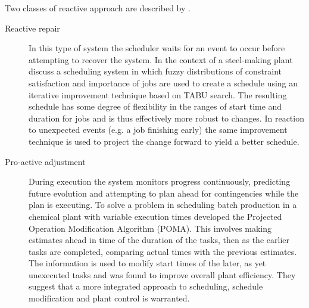 Two classes of reactive approach are described by \citet{jones98survey}.
\begin{description}
\item [Reactive repair] In this type of system the scheduler waits for an event to occur before attempting to recover the system. In the context of a steel-making plant \citet{dorn95reactive} discuss a scheduling system in which fuzzy distributions of constraint satisfaction and importance of jobs are used to create a schedule using an iterative improvement technique based on TABU search. The resulting schedule has some degree of flexibility in the ranges of start time and duration for jobs and is thus effectively more robust to changes. In reaction to unexpected events (e.g. a job finishing early) the same improvement technique is used to project the change forward to yield a better schedule.

\item [Pro-active adjustment] During execution the system monitors progress continuously, predicting future evolution and attempting to plan ahead for contingencies while the plan is executing. To solve a problem in scheduling batch production in a chemical plant with variable execution times \citet{sanmarti96combined} developed the Projected Operation Modification Algorithm (POMA). This involves making estimates ahead in time of the duration of the tasks, then as the earlier tasks are completed, comparing actual times with the previous estimates. The information is used to modify start times of the later, as yet unexecuted tasks and was found to improve overall plant efficiency. They suggest that a more integrated approach to scheduling, schedule modification and plant control is warranted.

\end{description}





